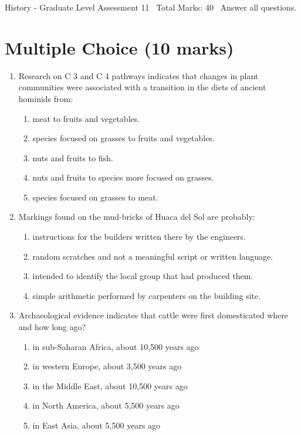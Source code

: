 \documentclass[12pt]{article}
\begin{document}
\begin{center}
History - Graduate Level Assessment 11 \
Total Marks: 40 \
Answer all questions.
\end{center}

\section*{Multiple Choice (10 marks)}
\begin{enumerate}[label=\arabic*.]
\item Research on C 3 and C 4 pathways indicates that changes in plant communities were associated with a transition in the diets of ancient hominids from:
\begin{enumerate}[label=(\alph*)]
    \item meat to fruits and vegetables.
    \item species focused on grasses to fruits and vegetables.
    \item nuts and fruits to fish.
    \item nuts and fruits to species more focused on grasses.
    \item species focused on grasses to meat.
\end{enumerate}
\item Markings found on the mud-bricks of Huaca del Sol are probably:
\begin{enumerate}[label=(\alph*)]
    \item instructions for the builders written there by the engineers.
    \item random scratches and not a meaningful script or written language.
    \item intended to identify the local group that had produced them.
    \item simple arithmetic performed by carpenters on the building site.
\end{enumerate}
\item Archaeological evidence indicates that cattle were first domesticated where and how long ago?
\begin{enumerate}[label=(\alph*)]
    \item in sub-Saharan Africa, about 10,500 years ago
    \item in western Europe, about 3,500 years ago
    \item in the Middle East, about 10,500 years ago
    \item in North America, about 5,500 years ago
    \item in East Asia, about 5,500 years ago

\end{enumerate}
\end{enumerate}
\end{document}
